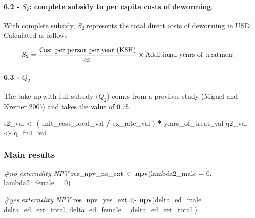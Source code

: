 \documentclass[]{article}
\newenvironment{Shaded}{\begin{snugshade}}{\end{snugshade}}
\newcommand{\CommentTok}[1]{\textcolor[rgb]{0.56,0.35,0.01}{\textit{#1}}}
\newcommand{\DataTypeTok}[1]{\textcolor[rgb]{0.13,0.29,0.53}{#1}}
\newcommand{\DecValTok}[1]{\textcolor[rgb]{0.00,0.00,0.81}{#1}}
\newcommand{\KeywordTok}[1]{\textcolor[rgb]{0.13,0.29,0.53}{\textbf{#1}}}
\newcommand{\NormalTok}[1]{#1}
\newcommand{\OperatorTok}[1]{\textcolor[rgb]{0.81,0.36,0.00}{\textbf{#1}}}
\newcommand{\StringTok}[1]{\textcolor[rgb]{0.31,0.60,0.02}{#1}}
\let\oldparagraph\paragraph
\renewcommand{\paragraph}[1]{\oldparagraph{#1}\mbox{}}
\begin{document}
\hypertarget{s_2-complete-subsidy-to-per-capita-costs-of-deworming.}{%
\paragraph{\texorpdfstring{6.2 - \(S_{2}\): complete subsidy to per
capita costs of
deworming.}{6.2 - S\_\{2\}: complete subsidy to per capita costs of deworming.}}\label{s_2-complete-subsidy-to-per-capita-costs-of-deworming.}}

With complete subsidy, \(S_2\) represents the total direct costs of
deworming in USD. Calculated as follows

\begin{equation}
S_{2} = \frac{\text{Cost per person per year (KSH)} }{ex}\times \text{Additional years of treatment} \\ 
\end{equation}

\hypertarget{q_2}{%
\paragraph{\texorpdfstring{6.3 - \(Q_{2}\)}{6.3 - Q\_\{2\}}}\label{q_2}}

The take-up with full subsidy (\(Q_2\)) comes from a previous study
(Miguel and Kremer 2007) and takes the value of 0.75.

\begin{Shaded}
\begin{Highlighting}[]
\NormalTok{s2_val <-}\StringTok{ }\NormalTok{( unit_cost_local_val }\OperatorTok{/}\StringTok{ }\NormalTok{ex_rate_val ) }\OperatorTok{*}\StringTok{ }\NormalTok{years_of_treat_val}
\NormalTok{q2_val <-}\StringTok{ }\NormalTok{q_full_val}
\end{Highlighting}
\end{Shaded}

\hypertarget{main-results}{%
\subsubsection{Main results}\label{main-results}}

\begin{Shaded}
\begin{Highlighting}[]
\CommentTok{#no externality NPV}
\NormalTok{res_npv_no_ext <-}\StringTok{ }\KeywordTok{npv}\NormalTok{(}\DataTypeTok{lambda2_male =} \DecValTok{0}\NormalTok{, }\DataTypeTok{lambda2_female =} \DecValTok{0}\NormalTok{)}

\CommentTok{#yes externality NPV}
\NormalTok{res_npv_yes_ext <-}\StringTok{ }\KeywordTok{npv}\NormalTok{(}\DataTypeTok{delta_ed_male =}\NormalTok{ delta_ed_ext_total, }
                       \DataTypeTok{delta_ed_female =}\NormalTok{ delta_ed_ext_total )}
\end{Highlighting}
\end{Shaded}
\end{document}
